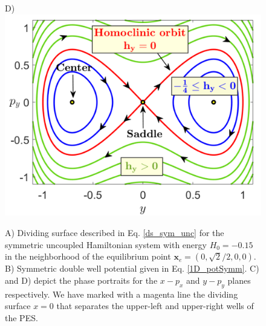 \documentclass[10pt,aps,onecolumn,superscriptaddress]{revtex4-2}
\begin{document}
\begin{figure}[htbp]
\begin{center}
			D)\includegraphics[scale=0.32]{phasePort_symm_1D_yDoF}
		\end{center}
		\caption{A) Dividing surface described in Eq. \eqref{ds_sym_unc} for the symmetric uncoupled Hamiltonian system with energy $H_0 = -0.15$ in the neighborhood of the equilibrium point $\mathbf{x}_e = (0,\sqrt{2}/2,0,0)$. B) Symmetric double well potential given in Eq. \eqref{1D_potSymm}. C) and D) depict the phase portraits for the $x-p_x$ and $y-p_y$ planes respectively. We have marked with a magenta line the dividing surface $x = 0$ that separates the upper-left and upper-right wells of the PES.}
		\label{phasePort_1DoF_symm}
	\end{figure}
\end{document}
